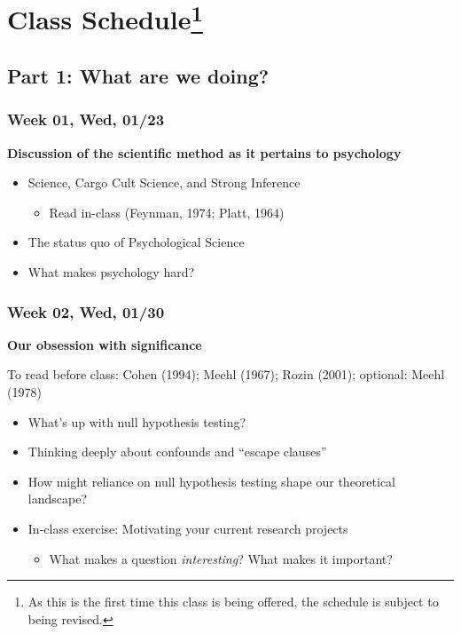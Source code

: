 \documentclass[11pt,man]{article}
\providecommand{\tightlist}{%
  \setlength{\itemsep}{0pt}\setlength{\parskip}{0pt}}
\begin{document}
\section[Class Schedule]{\texorpdfstring{Class Schedule\footnote{As this
  is the first time this class is being offered, the schedule is subject
  to being revised.}}{Class Schedule}}\label{class-schedule1}

\subsection{Part 1: What are we doing?}\label{part-1-what-are-we-doing}

\subsubsection{Week 01, Wed, 01/23}\label{week-01-wed-0123}

\textbf{Discussion of the scientific method as it pertains to
psychology}

\begin{itemize}
\tightlist
\item
  Science, Cargo Cult Science, and Strong Inference

  \begin{itemize}
  \tightlist
  \item
    Read in-class (Feynman, 1974; Platt, 1964)
  \end{itemize}
\item
  The status quo of Psychological Science
\item
  What makes psychology hard?
\end{itemize}

\subsubsection{Week 02, Wed, 01/30}\label{week-02-wed-0130}

\textbf{Our obsession with significance}

To read before class: Cohen (1994); Meehl (1967); Rozin (2001);
optional: Meehl (1978)

\begin{itemize}
\tightlist
\item
  What's up with null hypothesis testing?
\item
  Thinking deeply about confounds and ``escape clauses''
\item
  How might reliance on null hypothesis testing shape our theoretical
  landscape?
\item
  In-class exercise: Motivating your current research projects

  \begin{itemize}
  \tightlist
  \item
    What makes a question \emph{interesting}? What makes it important?
  \end{itemize}
\end{itemize}
\end{document}
